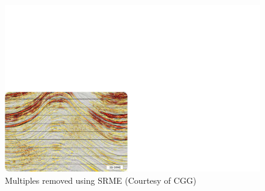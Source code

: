 \documentclass[xcolor=dvipsnames,notes]{beamer}
\begin{document}
\begin{frame}
\begin{figure}
\includegraphics[width=1.0\textwidth]{Fig/ch6-srme2.pdf}
\caption{Multiples removed using SRME (Courtesy of CGG)}
\end{figure}
\end{frame}
%
\end{document}
